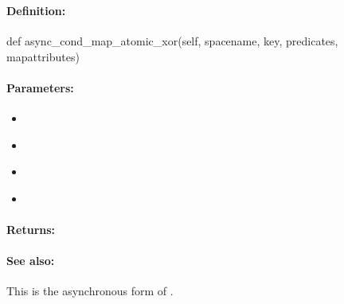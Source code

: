 \pagebreak
\subsubsection{}
\label{api:python:async_cond_map_atomic_xor}


\paragraph{Definition:}
\begin{pythoncode}
def async_cond_map_atomic_xor(self, spacename, key, predicates, mapattributes)
\end{pythoncode}

\paragraph{Parameters:}
\begin{itemize}[noitemsep]
\item {}\\

\item {}\\

\item {}\\

\item {}\\

\end{itemize}

\paragraph{Returns:}


\paragraph{See also:}  This is the asynchronous form of .

\pagebreak
\subsubsection{}
\label{api:python:map_string_prepend}


